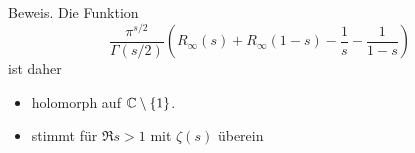 \begin{frame}
    \begin{block}{Beweis.}
        Die Funktion \[
            \frac{\pi^{s/2}}{\Gamma(s/2)}\left(R_\infty(s) + R_\infty(1-s) - \frac{1}{s} - \frac{1}{1-s}\right)
        \] ist daher
        \begin{itemize}
            \item<2-> holomorph auf $\mathbb{C} \setminus \{1\}$. 
            \item<3-> stimmt für $\Re s > 1$ mit $\zeta(s)$ überein
        \end{itemize}
    \end{block}
\end{frame}